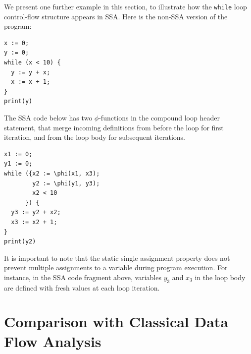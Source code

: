 

We present one further example in this section,
to illustrate how the \texttt{while} loop
control-flow structure appears in SSA.
Here is the non-SSA version of the program:

\begin{verbatim}
x := 0;
y := 0;
while (x < 10) {
  y := y + x;
  x := x + 1;
}
print(y)
\end{verbatim}

The SSA code below has
two $\phi$-functions in the compound loop header
statement, that
merge incoming definitions from before the loop
for first iteration,
and from the loop body for subsequent iterations.

\begin{verbatim}
x1 := 0;
y1 := 0;
while ({x2 := \phi(x1, x3);
        y2 := \phi(y1, y3); 
        x2 < 10
      }) {
  y3 := y2 + x2;
  x3 := x2 + 1;
}
print(y2)
\end{verbatim}

It is important to note that the static single assignment 
property does not prevent multiple assignments to a variable
during program execution. For instance, in the SSA code fragment above,
variables $y_3$ and $x_3$ in the loop body are defined with fresh values 
at each loop iteration.





\section{Comparison with Classical Data Flow Analysis}
\label{sec:vanilla:dfa}

